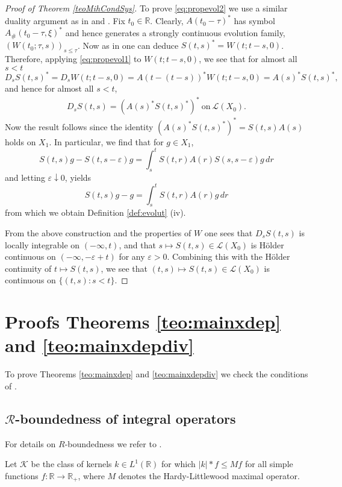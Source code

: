 \documentclass{amsart}
\theoremstyle{plain}
\theoremstyle{remark}
\theoremstyle{plain}
\numberwithin{equation}{section}
\begin{document}
\begin{proof}[Proof of Theorem \ref{teoMihCondSys}]
To prove \eqref{eq:propevol2} we use a similar duality argument as in \cite[Section 6]{AT3} and \cite[Proposition 2.9]{AFT}. Fix $t_0\in { \mathbb{R} }$. Clearly, $A(t_0-\tau)^*$ has symbol $A_{\#}(t_0-\tau,\xi)^*$ and hence generates a strongly continuous evolution family, $(W(t_0;\tau, s))_{s\leq \tau}$. Now as in \cite[Proposition 2.9]{AFT} one can deduce $S(t,s)^* = W(t;t-s, 0)$. Therefore, applying \eqref{eq:propevol1} to $W(t;t-s, 0)$, we see that for almost all $s<t$
\[D_sS(t,s)^* = D_sW(t;t-s,0) = A(t-(t-s))^* W(t;t-s,0) = A(s)^* S(t,s)^*, \]
and hence for almost all $s<t$,
\begin{align}\label{eq:Sstarid}
D_s S(t,s) = (A(s)^* S(t,s)^*)^* \ \text{on} \ {{\mathscr L}}(X_0).
\end{align}
Now the result follows since the identity $(A(s)^* S(t,s)^*)^* = S(t,s) A(s)$ holds on $X_1$. In particular, we find that for $g\in X_1$,
\[S(t,s) g - S(t,s-\varepsilon) g = \int_s^t S(t,r) A(r) S(s,s-\varepsilon) g\, dr\]
and letting $\varepsilon\downarrow 0$, yields
\[S(t,s) g - g = \int_s^t S(t,r) A(r)  g\, dr\]
from which we obtain Definition \ref{def:evolut} (iv).

From the above construction and the properties of $W$ one sees that $D_s S(t,s)$ is locally integrable on $(-\infty, t)$, and that $s\mapsto S(t,s)\in {{\mathscr L}}(X_0)$ is H\"older continuous on $(-\infty, -\varepsilon+t)$ for any $\varepsilon>0$. Combining this with the H\"older continuity of $t\mapsto S(t,s)$, we see that $(t,s)\mapsto S(t,s)\in {{\mathscr L}}(X_0)$ is continuous on $\{(t,s):s<t\}$.
\end{proof}

\section{Proofs Theorems \ref{teo:mainxdep} and \ref{teo:mainxdepdiv}\label{sec:proofs}}

To prove Theorems \ref{teo:mainxdep} and \ref{teo:mainxdepdiv} we check the conditions of \cite[Theorem 4.9]{GV}.

\subsection{${\ensuremath{\mathcal{R}}}$-boundedness of integral operators}
For details on $R$-boundedness  we refer to \cite{CPSW, DHP, KW}.

Let ${\mathcal{K}}$ be the class of kernels $k\in L^1({ \mathbb{R} })$ for which $|k|*f\leq Mf$ for all simple functions $f:{ \mathbb{R} }\to { \mathbb{R} }_+$, where $M$ denotes the Hardy-Littlewood maximal operator.
\end{document}
